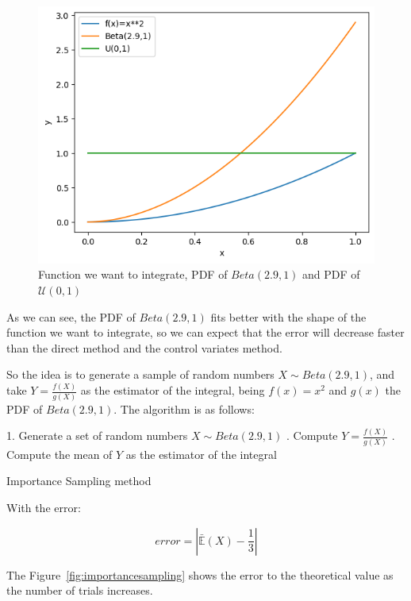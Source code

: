 \documentclass{article}
\begin{document}
\begin{figure}[H]
	\centering
	\includegraphics[width=0.5\linewidth]{./Figures/VarianceReduction/beta.png}
	\caption{Function we want to integrate, PDF of \(Beta(2.9,1)\) and PDF of \(\mathcal{U}(0,1)\)}
	\label{fig:beta42_f}
\end{figure}

As we can see, the PDF of \(Beta(2.9,1)\) fits better with the shape of the function we want to integrate, so we can expect that the error will decrease faster than the direct method and the control variates method. 

So the idea is to generate a sample of random numbers \(X \sim Beta(2.9,1)\), and take \(Y = \frac{f(X)}{g(X)}\) as the estimator of the integral, being \(f(x) = x^2\) and \(g(x)\) the PDF of \(Beta(2.9,1)\). The algorithm is as follows:

\begin{center}
	\begin{minipage}{0.7\linewidth} %
		\begin{algorithm}[H]
			1. Generate a set of random numbers \(X \sim Beta(2.9,1)\) . Compute \(Y = \frac{f(X)}{g(X)}\) . Compute the mean of \(Y\) as the estimator of the integral \;
			\caption{Importance Sampling method} %
			\label{alg:importancesampling}   %
		\end{algorithm}
	\end{minipage}
\end{center}

With the error:

\begin{equation*} error = | \bar{\mathbb{E}}(X) - \frac{1}{3} | \end{equation*}

The Figure~\ref{fig:importancesampling} shows the error to the theoretical value as the number of trials increases.
\end{document}
